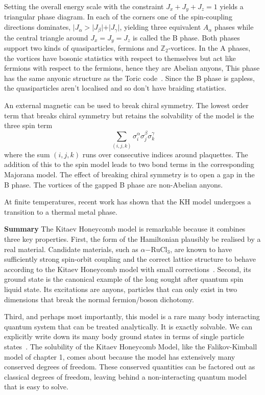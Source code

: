 Setting the overall energy scale with the constraint \(J_x + J_y + J_z = 1\) yields a triangular phase diagram. In each of the corners one of the spin-coupling directions dominates, \(|J_\alpha > |J_\beta| + |J_\gamma|\), yielding three equivalent \(A_\alpha\) phases while the central triangle around \(J_x = J_y = J_z\) is called the B phase. Both phases support two kinds of quasiparticles, fermions and \(\mathbb{Z}_2\)-vortices. In the A phases, the vortices have bosonic statistics with respect to themselves but act like fermions with respect to the fermions, hence they are Abelian anyons, This phase has the same anyonic structure as the Toric code~\autocite{kitaev_fault-tolerant_2003}. Since the B phase is gapless, the quasiparticles aren't localised and so don't have braiding statistics.

An external magnetic can be used to break chiral symmetry. The lowest order term that breaks chiral symmetry but retains the solvability of the model is the three spin term \[
\sum_{(i,j,k)} \sigma_i^{\alpha} \sigma_j^{\beta} \sigma_k^{\gamma}
\] where the sum \((i,j,k)\) runs over consecutive indices around plaquettes. The addition of this to the spin model leads to two bond terms in the corresponding Majorana model. The effect of breaking chiral symmetry is to open a gap in the B phase. The vortices of the gapped B phase are non-Abelian anyons.

At finite temperatures, recent work has shown that the KH model undergoes a transition to a thermal metal phase.

\textbf{Summary} The Kitaev Honeycomb model is remarkable because it combines three key properties. First, the form of the Hamiltonian plausibly be realised by a real material. Candidate materials, such as \(\alpha\mathrm{-RuCl}_3\), are known to have sufficiently strong spin-orbit coupling and the correct lattice structure to behave according to the Kitaev Honeycomb model with small corrections~\autocite{banerjeeProximateKitaevQuantum2016,TrebstPhysRep2022}. Second, its ground state is the canonical example of the long sought after quantum spin liquid state. Its excitations are anyons, particles that can only exist in two dimensions that break the normal fermion/boson dichotomy.

Third, and perhaps most importantly, this model is a rare many body interacting quantum system that can be treated analytically. It is exactly solvable. We can explicitly write down its many body ground states in terms of single particle states~\autocite{kitaevAnyonsExactlySolved2006}. The solubility of the Kitaev Honeycomb Model, like the Falikov-Kimball model of chapter 1, comes about because the model has extensively many conserved degrees of freedom. These conserved quantities can be factored out as classical degrees of freedom, leaving behind a non-interacting quantum model that is easy to solve.

